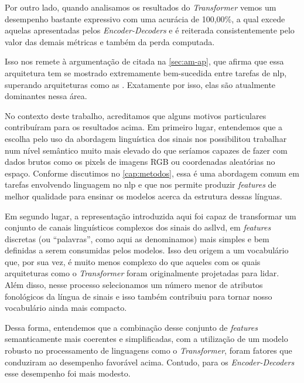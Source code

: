Por outro lado, quando analisamos os resultados do \textit{Transformer} vemos um desempenho bastante expressivo com uma acurácia de 100,00\%, a qual excede aquelas apresentadas pelos \textit{Encoder-Decoders} e é reiterada consistentemente pelo valor das demais métricas e também da perda computada.

Isso nos remete à argumentação de  citada na \autoref{sec:am-ap}, que afirma que essa arquitetura tem se mostrado extremamente bem-sucedida entre tarefas de \acrfull{nlp}, superando arquiteturas como as . Exatamente por isso, elas são atualmente dominantes nessa área.

No contexto deste trabalho, acreditamos que alguns motivos particulares contribuíram para os resultados acima.
Em primeiro lugar, entendemos que a escolha pelo uso da abordagem linguística dos sinais nos possibilitou trabalhar num nível semântico muito mais elevado do que seríamos capazes de fazer com dados brutos como os pixels de imagens RGB ou coordenadas aleatórias no espaço. Conforme discutimos no \autoref{cap:metodos}, essa é uma abordagem comum em tarefas envolvendo linguagem no \acrshort{nlp} e que nos permite produzir \textit{features} de melhor qualidade para ensinar os modelos acerca da estrutura dessas línguas.

Em segundo lugar, a representação introduzida aqui foi capaz de transformar um conjunto de canais linguísticos complexos dos sinais do \acrshort{asllvd}, em \textit{features} discretas (ou ``palavras'', como aqui as denominamos) mais simples e bem definidas a serem consumidas pelos modelos.
Isso deu origem a um vocabulário que, por sua vez, é muito menos complexo do que aqueles com os quais arquiteturas como o \textit{Transformer} foram originalmente projetadas para lidar. Além disso, nesse processo selecionamos um número menor de atributos fonológicos da língua de sinais e isso também contribuiu para tornar nosso vocabulário ainda mais compacto.

Dessa forma, entendemos que a combinação desse conjunto de \textit{features} semanticamente mais coerentes e simplificadas, com a utilização de um modelo robusto no processamento de linguagens como o \textit{Transformer}, foram fatores que conduziram ao desempenho favorável acima.
Contudo, para os \textit{Encoder-Decoders} esse desempenho foi mais modesto.












